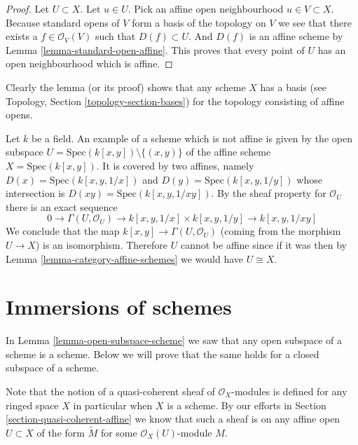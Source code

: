 \begin{proof}
Let $U \subset X$. Let $u \in U$.
Pick an affine open neighbourhood $u \in V \subset X$.
Because standard opens of $V$ form a basis of the topology
on $V$ we see that there exists a $f\in \mathcal{O}_V(V)$
such that $D(f) \subset U$. And $D(f)$ is an affine scheme
by Lemma \ref{lemma-standard-open-affine}. This proves that every point
of $U$ has an open neighbourhood which is affine.
\end{proof}

\noindent
Clearly the lemma (or its proof) shows that any scheme
$X$ has a basis (see Topology, Section \ref{topology-section-bases})
for the topology consisting of affine opens.

\begin{example}
\label{example-not-affine}
Let $k$ be a field.
An example of a scheme which is not affine is
given by the open subspace
$U = \text{Spec}(k[x, y]) \setminus \{ (x, y)\}$
of the affine scheme $X =\text{Spec}(k[x, y])$.
It is covered by two affines, namely $D(x) = \text{Spec}(k[x, y, 1/x])$
and $D(y) = \text{Spec}(k[x, y, 1/y])$ whose intersection is
$D(xy) = \text{Spec}(k[x, y, 1/xy])$. By the sheaf property
for $\mathcal{O}_U$ there is an exact sequence
$$
0 \to
\Gamma(U, \mathcal{O}_U) \to
k[x, y, 1/x] \times k[x, y, 1/y] \to
k[x, y, 1/xy]
$$
We conclude that the map $k[x, y] \to \Gamma(U, \mathcal{O}_U)$
(coming from the morphism $U \to X$) is an isomorphism.
Therefore $U$ cannot be affine since if it was then by
Lemma \ref{lemma-category-affine-schemes} we would have $U \cong X$.
\end{example}











\section{Immersions of schemes}
\label{section-immersions}

\noindent
In Lemma \ref{lemma-open-subspace-scheme} we saw that any open subspace
of a scheme is a scheme. Below we will prove that the same holds for
a closed subspace of a scheme.

\medskip\noindent
Note that the notion of a quasi-coherent sheaf of $\mathcal{O}_X$-modules
is defined for any ringed space $X$ in particular when $X$ is a scheme.
By our efforts in Section \ref{section-quasi-coherent-affine} we
know that such a sheaf is on any affine open $U \subset X$
of the form $\widetilde M$ for some $\mathcal{O}_X(U)$-module $M$.

